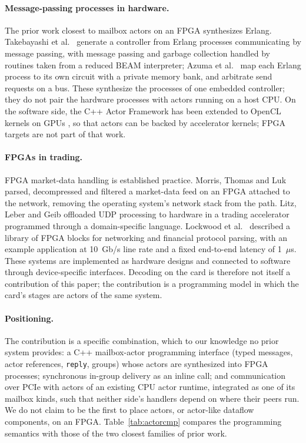 \documentclass[11pt]{article}
\begin{document}
\paragraph{Message-passing processes in hardware.} The prior work closest to
mailbox actors on an FPGA synthesizes Erlang. Takebayashi et al.\ \cite{erlanghls2016}
generate a controller from Erlang processes communicating by message passing,
with message passing and garbage collection handled by routines taken from a
reduced BEAM interpreter; Azuma et al.\ \cite{erlanghls2017} map each Erlang
process to its own circuit with a private memory bank, and arbitrate send
requests on a bus. These synthesize the processes of one embedded controller;
they do not pair the hardware processes with actors running on a host CPU. On
the software side, the C++ Actor Framework has been extended to OpenCL kernels on
GPUs \cite{cafopencl2015}, so that actors can be backed by accelerator kernels;
FPGA targets are not part of that work.

\paragraph{FPGAs in trading.} FPGA market-data handling is established
practice. Morris, Thomas and Luk \cite{morris2009} parsed, decompressed and
filtered a market-data feed on an FPGA attached to the network, removing the
operating system's network stack from the path. Litz, Leber and Geib
\cite{litz2011} offloaded UDP processing to hardware in a trading
accelerator programmed through a domain-specific language. Lockwood et al.\
\cite{lockwood2012} described a library of FPGA blocks for networking and
financial protocol parsing, with an example application at 10~Gb/s line rate
and a fixed end-to-end latency of 1~$\mu$s. These systems are implemented as
hardware designs and connected to software through device-specific interfaces.
Decoding on the card is therefore not itself a contribution of this paper; the
contribution is a programming model in which the card's stages are actors of
the same system.

\paragraph{Positioning.} The contribution is a specific combination, which to
our knowledge no prior system provides: a C++ mailbox-actor programming
interface (typed messages, actor references, \texttt{reply}, groups) whose
actors are synthesized into FPGA processes; synchronous in-group delivery as an
inline call; and communication over PCIe with actors of an existing CPU actor
runtime, integrated as one of its mailbox kinds, such that neither side's
handlers depend on where their peers run. We do not claim to be the first to
place actors, or actor-like dataflow components, on an FPGA.
Table~\ref{tab:actorcmp} compares the programming semantics with those of the two
closest families of prior work.
\end{document}
